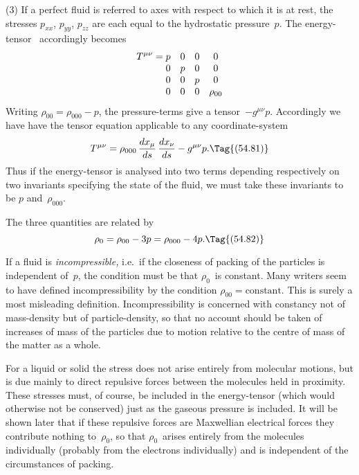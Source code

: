 \documentclass[12pt]{book}
\begin{document}
(3) If a perfect fluid is referred to axes with respect to which it is at rest,
the stresses $p_{xx}$, $p_{yy}$, $p_{zz}$ are each equal to the hydrostatic pressure~$p$. The
%
%
energy\hyp{}tensor~ accordingly becomes
\[
T^{\mu\nu} = \begin{array}[t]{@{}c@{\quad}c@{\quad}c@{\quad}c@{}}
  p & 0 & 0 & 0\\
  0 & p & 0 & 0\\
  0 & 0 & p & 0\\
  0 & 0 & 0 & \rho_{00}\\
\end{array}
\]
Writing $\rho_{00} = \rho_{000} - p$, the pressure\hyp{}terms give a tensor~$-g^{\mu\nu} p$. Accordingly
we have have the tensor equation applicable to any coordinate\hyp{}system
\[
T^{\mu\nu} = \rho_{000}\, \frac{dx_{\mu}}{ds}\, \frac{dx_{\nu}}{ds} - g^{\mu\nu} p.
\Tag{(54.81)}
\]
Thus if the energy\hyp{}tensor is analysed into two terms depending respectively
on two invariants specifying the state of the fluid, we must take these invariants
to be $p$ and~$\rho_{000}$.

The three quantities are related by
\[
\rho_{0} = \rho_{00} - 3p = \rho_{000} - 4p.
\Tag{(54.82)}
\]

If a fluid is \emph{incompressible,} i.e.\ if the closeness of packing of the particles
is independent of~$p$, the condition must be that $\rho_{0}$~is constant\footnotemark.\footnotetext
  {Many writers seem to have defined incompressibility by the condition $\rho_{00} = \text{constant}$. This
%
  is surely a most misleading definition.}
Incompressibility
is concerned with constancy not of mass\hyp{}density but of particle\hyp{}density,
so that no account should be taken of increases of mass of the particles due
to motion relative to the centre of mass of the matter as a whole.

For a liquid or solid the stress does not arise entirely from molecular
motions, but is due mainly to direct repulsive forces between the molecules held
in proximity. These stresses must, of course, be included in the energy\hyp{}tensor
(which would otherwise not be conserved) just as the gaseous pressure is
included. It will be shown later that if these repulsive forces are Maxwellian
electrical forces they contribute nothing to~$\rho_{0}$, so that $\rho_{0}$~arises entirely from
the molecules individually (probably from the electrons individually) and is
independent of the circumstances of packing.
\end{document}
